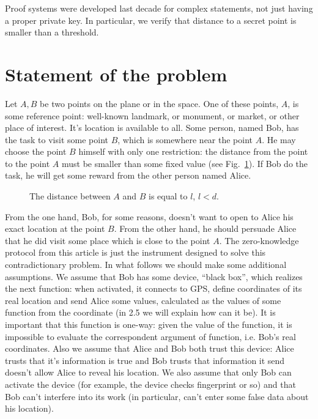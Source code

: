 \documentclass{article}
\begin{document}
Proof systems were developed last decade for complex statements, not just having a proper private key.
In particular, we verify that distance to a secret point is smaller than a threshold.

\section{Statement of the problem}

Let $A, B$ be two points on the plane or in the space.
One of these points, $A$, is some reference point: well-known landmark, or monument, or market, or other place of interest.
It’s location is available to all.
Some person, named Bob, has the task to visit some point $B$, which is somewhere near the point $A$.
He may choose the point $B$ himself with only one restriction: the distance from the point      
to the point $A$ must be smaller than some fixed value (see Fig.~\ref{fig-1}).
If Bob do the task, he will get some reward from the other person named Alice.
\begin{figure}
  \centering
  \def\svgwidth{200bp}
  
\caption{The distance between $A$ and $B$ is equal to $l$, $l < d$.}
\label{fig-1}
\end{figure}
%
From the one hand, Bob, for some reasons, doesn’t want to open to Alice his exact location at the point $B$.
From the other hand, he should persuade Alice that he did visit some place which is close to the point $A$.
The zero-knowledge protocol from this article is just the instrument designed to solve this contradictionary problem.
In what follows we should make some additional assumptions.
We assume that Bob has some device, “black box”, which realizes the next function: when activated, it connects to GPS,
define coordinates of its real location and send Alice some values, calculated as the values of some function from the coordinate (in 2.5 we will explain how can it be).
It is important that this function is one-way: given the value of the function, it is impossible to evaluate the correspondent argument of function, i.e. Bob’s real coordinates.
Also we assume that Alice and Bob both trust this device: Alice trusts that it’s information is true and Bob trusts that information it send doesn’t allow Alice to reveal his location.
We also assume that only Bob can activate the device (for example, the device checks fingerprint or so) and that Bob can’t interfere into its work (in particular,
can’t enter some false data about his location).
\end{document}
